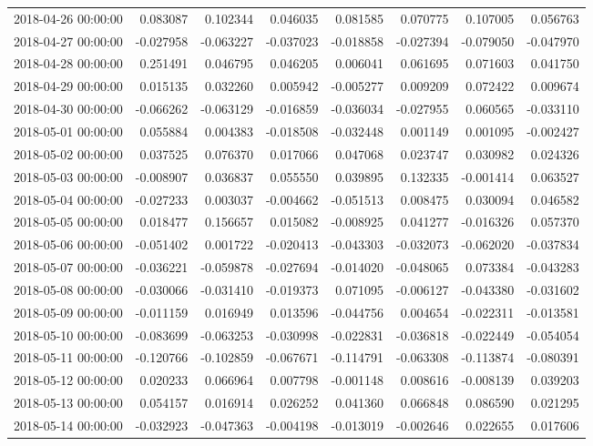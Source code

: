 \begin{tabular}{lrrrrrrr}
2018-04-26 00:00:00 & 0.083087 & 0.102344 & 0.046035 & 0.081585 & 0.070775 & 0.107005 & 0.056763 \\
2018-04-27 00:00:00 & -0.027958 & -0.063227 & -0.037023 & -0.018858 & -0.027394 & -0.079050 & -0.047970 \\
2018-04-28 00:00:00 & 0.251491 & 0.046795 & 0.046205 & 0.006041 & 0.061695 & 0.071603 & 0.041750 \\
2018-04-29 00:00:00 & 0.015135 & 0.032260 & 0.005942 & -0.005277 & 0.009209 & 0.072422 & 0.009674 \\
2018-04-30 00:00:00 & -0.066262 & -0.063129 & -0.016859 & -0.036034 & -0.027955 & 0.060565 & -0.033110 \\
2018-05-01 00:00:00 & 0.055884 & 0.004383 & -0.018508 & -0.032448 & 0.001149 & 0.001095 & -0.002427 \\
2018-05-02 00:00:00 & 0.037525 & 0.076370 & 0.017066 & 0.047068 & 0.023747 & 0.030982 & 0.024326 \\
2018-05-03 00:00:00 & -0.008907 & 0.036837 & 0.055550 & 0.039895 & 0.132335 & -0.001414 & 0.063527 \\
2018-05-04 00:00:00 & -0.027233 & 0.003037 & -0.004662 & -0.051513 & 0.008475 & 0.030094 & 0.046582 \\
2018-05-05 00:00:00 & 0.018477 & 0.156657 & 0.015082 & -0.008925 & 0.041277 & -0.016326 & 0.057370 \\
2018-05-06 00:00:00 & -0.051402 & 0.001722 & -0.020413 & -0.043303 & -0.032073 & -0.062020 & -0.037834 \\
2018-05-07 00:00:00 & -0.036221 & -0.059878 & -0.027694 & -0.014020 & -0.048065 & 0.073384 & -0.043283 \\
2018-05-08 00:00:00 & -0.030066 & -0.031410 & -0.019373 & 0.071095 & -0.006127 & -0.043380 & -0.031602 \\
2018-05-09 00:00:00 & -0.011159 & 0.016949 & 0.013596 & -0.044756 & 0.004654 & -0.022311 & -0.013581 \\
2018-05-10 00:00:00 & -0.083699 & -0.063253 & -0.030998 & -0.022831 & -0.036818 & -0.022449 & -0.054054 \\
2018-05-11 00:00:00 & -0.120766 & -0.102859 & -0.067671 & -0.114791 & -0.063308 & -0.113874 & -0.080391 \\
2018-05-12 00:00:00 & 0.020233 & 0.066964 & 0.007798 & -0.001148 & 0.008616 & -0.008139 & 0.039203 \\
2018-05-13 00:00:00 & 0.054157 & 0.016914 & 0.026252 & 0.041360 & 0.066848 & 0.086590 & 0.021295 \\
2018-05-14 00:00:00 & -0.032923 & -0.047363 & -0.004198 & -0.013019 & -0.002646 & 0.022655 & 0.017606 \\

\end{tabular}

